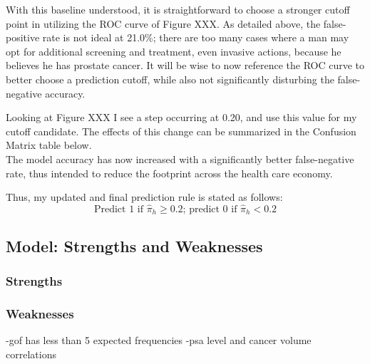 With this baseline understood, it is straightforward to choose a stronger cutoff point in utilizing the ROC curve of Figure XXX. As detailed above, the false-positive rate is not ideal at 21.0\%; there are too many cases where a man may opt for additional screening and treatment, even invasive actions, because he believes he has prostate cancer. It will be wise to now reference the ROC curve to better choose a prediction cutoff, while also not significantly disturbing the false-negative accuracy. \par

Looking at Figure XXX I see a step occurring at 0.20, and use this value for my cutoff candidate. The effects of this change can be summarized in the Confusion Matrix table below. \\
The model accuracy has now increased with a significantly better false-negative rate, thus intended to reduce the footprint across the health care economy. \par

Thus, my updated and final prediction rule is stated as follows:
\begin{equation}
	\textrm{Predict 1 if } \hat{\pi}_h \geq 0.2\textrm{; predict 0 if } \hat{\pi}_h < 0.2
\end{equation}

\subsection{Model: Strengths and Weaknesses}

\subsubsection{Strengths}
\subsubsection{Weaknesses}
-gof has less than 5 expected frequencies 
-psa level and cancer volume correlations